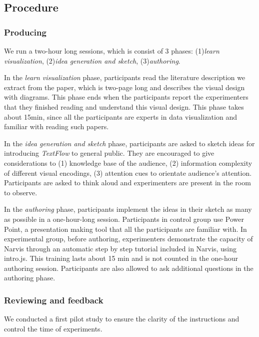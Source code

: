\subsection{Procedure}
\subsubsection{Producing}
We run a two-hour long sessions, which is consist of 3 phases: (1)\textit{learn visualization}, (2)\textit{idea generation and sketch}, (3)\textit{authoring}.\par
In the \textit{learn visualization} phase, participants read the literature description we extract from the paper, which is two-page long and describes the visual design with diagrams. This phase ends when the participants report the experimenters that they finished reading and understand this visual design. This phase takes about 15min, since all the participants are experts in data visualization and familiar with reading such papers.\par
In the \textit{idea generation and sketch} phase, participants are asked to sketch ideas for introducing \textit{TextFlow} to general public. They are encouraged to give considerations to (1) knowledge base of the audience, (2) information complexity of different visual encodings, (3) attention cues to orientate audience's attention. Participants are asked to think aloud and experimenters are present in the room to observe. \par
In the \textit{authoring} phase, participants implement the ideas in their sketch as many as possible in a one-hour-long session. Participants in control group use Power Point, a presentation making tool that all the participants are familiar with. In experimental group, before authoring, experimenters demonstrate the capacity of Narvis through an automatic step by step tutorial included in Narvis, using intro.js. This training lasts about 15 min and is not counted in the one-hour authoring session. Participants are also allowed to ask additional questions in the authoring phase.\par
\subsubsection{Reviewing and feedback}
We conducted a first pilot study to ensure the clarity of the instructions and control the time of experiments. 

